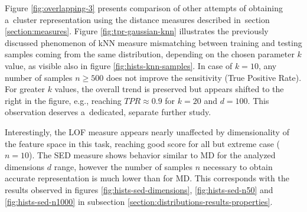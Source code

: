 Figure \ref{fig:overlapping-3} presents comparison of other attempts of obtaining a~cluster representation using the distance measures described in~section \ref{section:measures}.
Figure \ref{fig:tpr-gaussian-knn} illustrates the previously discussed phenomenon of kNN measure mismatching between training and testing samples coming from the same distribution, depending on the chosen parameter $k$ value, as visible also in figure \ref{fig:hists-knn-samples}. In case of $k = 10$, any number of samples $n \geq 500$ does not improve the sensitivity (True Positive Rate). For greater $k$ values, the overall trend is preserved but appears shifted to the right in the figure, e.g., reaching $TPR \approx 0.9$ for $k = 20$ and $d = 100$. This observation deserves a~dedicated, separate further study.

Interestingly, the LOF measure appears nearly unaffected by dimensionality of the feature space in this task, reaching good score for all but extreme case ($n = 10$). The SED measure shows behavior similar to MD for the analyzed dimensions $d$ range, however the number of samples $n$ necessary to obtain accurate representation is much lower than for MD. This corresponds with the results observed in figures \ref{fig:hists-sed-dimensions}, \ref{fig:hists-sed-n50} and \ref{fig:hists-sed-n1000} in subsection \ref{section:distributions-results-properties}.

